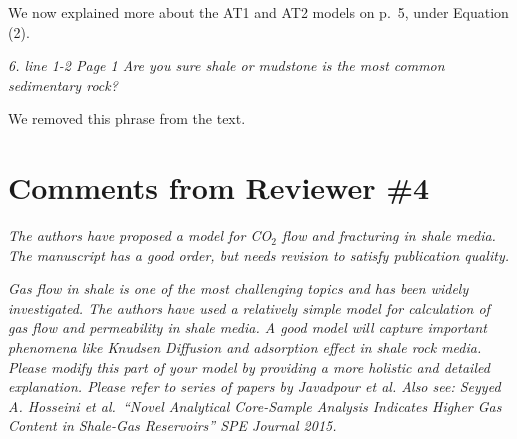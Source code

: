 \documentclass{elsarticle}
\newcommand{\review}[1]{ \textit{#1}}
\begin{document}
{{{We now explained more about the AT1 and AT2 models on p.~5, under Equation (2). 
}

\bigskip
    \review{6. line 1-2 Page 1 Are you sure shale or mudstone is the most common sedimentary rock?}

{We removed this phrase from the text.}

\section*{Comments from Reviewer \#4}

    \review{The authors have proposed a model for CO$_2$ flow and fracturing in shale media. The manuscript has a good order, but needs revision to satisfy publication quality.}

    \review{Gas flow in shale is one of the most challenging topics and has been widely investigated. The authors have used a relatively simple model for calculation of gas flow and permeability in shale media. A good model will capture important phenomena like Knudsen Diffusion and adsorption effect in shale rock media. Please modify this part of your model by providing a more holistic and detailed explanation. Please refer to series of papers by Javadpour et al. Also see: Seyyed A. Hosseini et al.~``Novel Analytical Core-Sample Analysis Indicates Higher Gas Content in Shale-Gas Reservoirs'' SPE Journal 2015.}

}}
\end{document}
